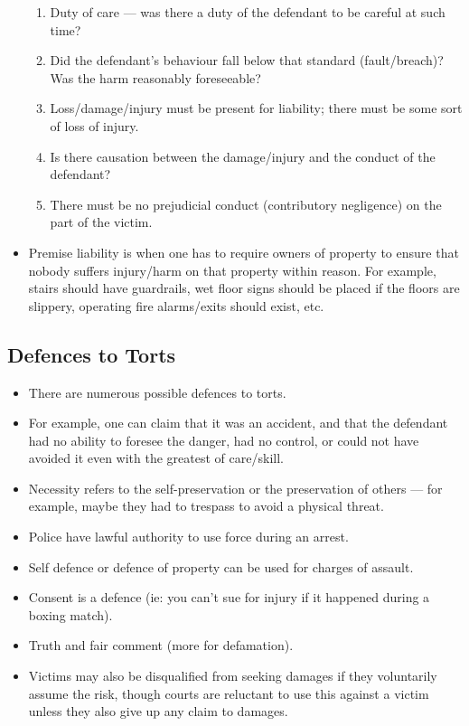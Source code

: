 \documentclass{article}
\begin{document}
\begin{itemize}
        \begin{enumerate}
            \item Duty of care --- was there a duty of the defendant to be careful at such time?
            \item Did the defendant's behaviour fall below that standard (fault/breach)?  Was the harm reasonably foreseeable?
            \item Loss/damage/injury must be present for liability; there must be some sort of loss of injury.
            \item Is there causation between the damage/injury and the conduct of the defendant?
            \item There must be no prejudicial conduct (contributory negligence) on the part of the victim.
        \end{enumerate}
    \item Premise liability is when one has to require owners of property to ensure that nobody suffers injury/harm on that property within reason.  For example, stairs should have guardrails, wet floor signs should be placed if the floors are slippery, operating fire alarms/exits should exist, etc.
\end{itemize}

\subsection{Defences to Torts}
\begin{itemize}
    \item There are numerous possible defences to torts.
    \item For example, one can claim that it was an accident, and that the defendant had no ability to foresee the danger, had no control, or could not have avoided it even with the greatest of care/skill.
    \item Necessity refers to the self-preservation or the preservation of others --- for example, maybe they had to trespass to avoid a physical threat.
    \item Police have lawful authority to use force during an arrest.
    \item Self defence or defence of property can be used for charges of assault.
    \item Consent is a defence (ie: you can't sue for injury if it happened during a boxing match).
    \item Truth and fair comment (more for defamation).
    \item Victims may also be disqualified from seeking damages if they voluntarily assume the risk, though courts are reluctant to use this against a victim unless they also give up any claim to damages.
\end{itemize}
\end{document}
